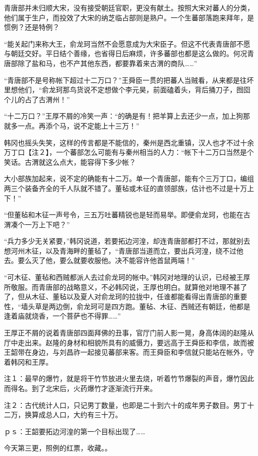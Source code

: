 青唐部并未归顺大宋，没有接受朝廷官职，更没有献土。按照大宋对蕃人的分类，他们属于生户，而投效了大宋的纳芝临占部则是熟户。一个生蕃部落跑来拜年，是惯例？还是特例？

“能关起门来称大王，俞龙珂当然不会愿意成为大宋臣子。但这不代表青唐部不愿与朝廷交好。平日结个善缘，也省得日后麻烦，许多蕃部也都是这么做的。何况青唐部除了盐和马，也不产其他东西，都要靠着来古渭的商队……”

“青唐部不是号称帐下超过十二万口？”王舜臣一贯的把蕃人当贼看，从来都是往坏里想他们，“俞龙珂那鸟货说不定想做个李元昊，前面磕着头，背后捅刀子，囫囵个儿的占了古渭州！”

“十二万口？”王厚不屑的冷笑一声：“的确是有！把羊算上去还少一点，加上狗那就多一点。再添个马，说不定能上十三万！”

韩冈也摇头失笑，这样的传言都是不能信的，秦州是西北重镇，汉人也才不过十余万丁口【注２】，一个蕃部怎么可能有与秦州相当的人力：“帐下十二万口当然是个笑话。古渭就这么点大，能容得下多少帐？

大小部族加起来，说不定的确能有十二万。单一个青唐部，能有个三万丁口，编组两三个装备齐全的千人队就不错了。董毡或木征的直领部族，估计也不过是十万上下！”

“但董毡和木征一声号令，三五万吐蕃精锐也是轻而易举。即便俞龙珂，也能在古渭凑个一万上下吧？”

“兵力多少无关紧要，”韩冈说道，若要拓边河湟，却连青唐部都打不过，那就别去想河州木征，以及青海畔的董毡了，“青唐部当道而立，要出兵河湟，绕不过他去。要么灭了他，要么就要收服他。决不能容许他首鼠两端！”

“可木征、董毡和西贼都派人去过俞龙珂的帐中。”韩冈对地理的认识，已经被王厚所敬服。而青唐部的战略意义，不必韩冈说，王厚也明白。就算他对地理不甚了了，但从木征、董毡以及夏人对俞龙珂的拉拢中，任谁都能看得出青唐部的重要性，“墙头草是两边倒，俞龙珂可是四方跑。董毡、木征、西贼还有朝廷，他都是逢着庙就烧香，一个菩萨也不得罪……”

王厚正不屑的说着青唐部四面拜佛的丑事，官厅门前人影一晃，身高体阔的赵隆从厅中走出来。赵隆的身材和相貌所具有的威慑力，要远高于王舜臣和李信，故而被王韶带在身边，与刘昌祚一起接见蕃部来客。而王舜臣和李信就只能站在帐外，守着韩冈和王厚。

注１：最早的爆竹，就是将干竹节放进火里去烧，听着竹节爆裂的声音，爆竹因此而得名。到了北宋后，火药爆竹才逐渐流行开来。

注２：古代统计人口，只记男丁数量，也即是二十到六十的成年男子数目。男丁十二万，换算成总人口，大约有三十万。

ｐｓ：王韶要拓边河湟的第一个目标出现了……

今天第三更，照例的红票，收藏。。

